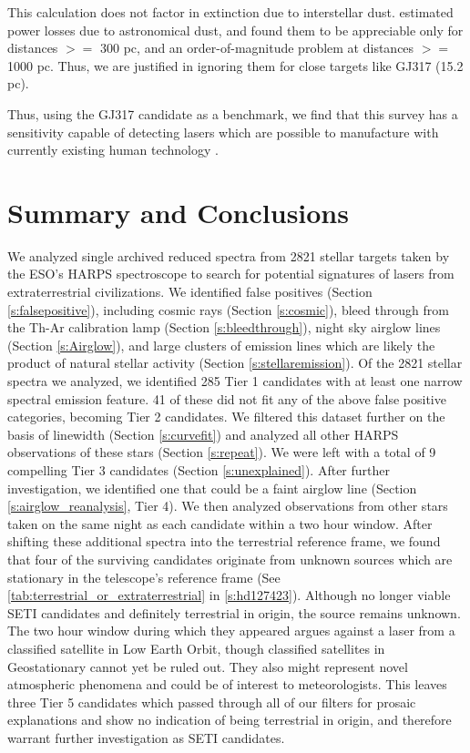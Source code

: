 \documentclass[twocolumn]{aastex701}
\begin{document}
This calculation does not factor in extinction due to interstellar dust.  \cite{Hippke_2018} estimated power losses due to astronomical dust, and found them to be appreciable only for distances $>=$ 300 pc, and an order-of-magnitude problem at distances $>=$ 1000 pc.  Thus, we are justified in ignoring them for close targets like GJ317 (15.2 pc).

Thus, using the GJ317 candidate as a benchmark, we find that this survey has a sensitivity capable of detecting lasers which are possible to manufacture with currently existing human technology \citep{Lander1997ContinuouswaveCD}.

\section{Summary and Conclusions}
We analyzed single archived reduced spectra from 2821 stellar targets taken by the ESO’s HARPS spectroscope to search for potential signatures of lasers from extraterrestrial civilizations. We identified false positives (Section \ref{s:falsepositive}), including cosmic rays (Section \ref{s:cosmic}), bleed through from the Th-Ar calibration lamp (Section \ref{s:bleedthrough}), night sky airglow lines (Section \ref{s:Airglow}), and large clusters of emission lines which are likely the product of natural stellar activity (Section \ref{s:stellaremission}). Of the 2821 stellar spectra we analyzed, we identified 285 Tier 1 candidates with at least one narrow spectral emission feature.  41 of these did not fit any of the above false positive categories, becoming Tier 2 candidates. We filtered this dataset further on the basis of linewidth (Section \ref{s:curvefit}) and analyzed all other HARPS observations of these stars (Section \ref{s:repeat}). We were left with a total of 9 compelling Tier 3 candidates (Section \ref{s:unexplained}). After further investigation, we identified one that could be a faint airglow line (Section \ref{s:airglow_reanalysis}, Tier 4). We then analyzed observations from other stars taken on the same night as each candidate within a two hour window. After shifting these additional spectra into the terrestrial reference frame, we found that four of the surviving candidates originate from unknown sources which are stationary in the telescope's reference frame (See 
\ref{tab:terrestrial_or_extraterrestrial} in \ref{s:hd127423}). Although no longer viable SETI candidates and definitely terrestrial in origin, the source remains unknown. The two hour window during which they appeared argues against a laser from a classified satellite in Low Earth Orbit, though classified satellites in Geostationary cannot yet be ruled out. They also might represent novel atmospheric phenomena and could be of interest to meteorologists. This leaves three Tier 5 candidates which passed through all of our filters for prosaic explanations and show no indication of being terrestrial in origin, and therefore warrant further investigation as SETI candidates.
\end{document}
